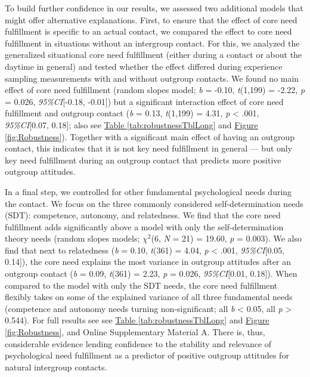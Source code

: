 \documentclass[man, 12pt, a4paper, mask]{apa7}
\theoremstyle{break}
\theoremstyle{plain}
\newcommand{\fgrref}[2][]{\hyperref[#2]{Figure \ref*{#2}#1}}
\newcommand{\tblref}[2][]{\hyperref[#2]{Table \ref*{#2}#1}}
\begin{document}
To build further confidence in our results, we assessed two additional
models that might offer alternative explanations. First, to ensure that
the effect of core need fulfillment is specific to an actual contact, we
compared the effect to core need fulfillment in situations without an
intergroup contact. For this, we analyzed the generalized situational
core need fulfillment (either during a contact or about the daytime in
general) and tested whether the effect differed during experience
sampling measurements with and without outgroup contacts. We found no
main effect of core need fulfillment (random slopes model; \textit{b} =
-0.10, \textit{t}(1,199) = -2.22, \textit{p} = 0.026,
\textit{95\%CI}{[}-0.18, -0.01{]}) but a significant interaction effect
of core need fulfillment and outgroup contact (\textit{b} = 0.13,
\textit{t}(1,199) = 4.31, \textit{p} \textless{} .001,
\textit{95\%CI}{[}0.07, 0.18{]}; also see \tblref{tab:robustnessTblLong}
and \fgrref{fig:Robustness}). Together with a significant main effect of
having an outgroup contact, this indicates that it is not key need
fulfillment in general --- but only key need fulfillment during an
outgroup contact that predicts more positive outgroup attitudes.

In a final step, we controlled for other fundamental psychological needs
during the contact. We focus on the three commonly considered
self-determination needs (SDT): competence, autonomy, and relatedness.
We find that the core need fulfillment adds significantly above a model
with only the self-determination theory needs (random slopes models;
\(\chi^2\)(6, \textit{N} = 21) = 19.60, \textit{p} = 0.003). We also
find that next to relatedness (\textit{b} = 0.10, \textit{t}(361) =
4.04, \textit{p} \textless{} .001, \textit{95\%CI}{[}0.05, 0.14{]}), the
core need explains the most variance in outgroup attitudes after an
outgroup contact (\textit{b} = 0.09, \textit{t}(361) = 2.23, \textit{p}
= 0.026, \textit{95\%CI}{[}0.01, 0.18{]}). When compared to the model
with only the SDT needs, the core need fulfillment flexibly takes on
some of the explained variance of all three fundamental needs
(competence and autonomy needs turning non-significant; all \textit{b}
\textless{} 0.05, all \textit{p} \textgreater{} 0.544). For full results
see see \tblref{tab:robustnessTblLong} and \fgrref{fig:Robustness}, and
Online Supplementary Material A. There is, thus, considerable evidence
lending confidence to the stability and relevance of psychological need
fulfillment as a predictor of positive outgroup attitudes for natural
intergroup contacts.
\end{document}
